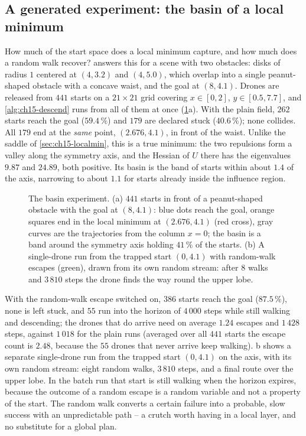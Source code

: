 \subsection{A generated experiment: the basin of a local minimum}
\label{sec:ch15-basin}

How much of the start space does a local minimum capture, and how much does
a random walk recover?  answers this for a scene
with two obstacles: disks of radius $1$ centered at $(4, 3.2)$ and $(4,
5.0)$, which overlap into a single peanut-shaped obstacle with a concave
waist, and the goal at $(8, 4.1)$. Drones are released from $441$ starts on
a $21 \times 21$ grid covering $x \in [0, 2]$, $y \in [0.5, 7.7]$, and
\cref{alg:ch15-descend} runs from all of them at once
(\cref{fig:ch15-basin}a). With the plain field, $262$ starts reach the goal
($59.4\,\%$) and $179$ are declared stuck ($40.6\,\%$); none collides. All
$179$ end at the \emph{same} point, $(2.676, 4.1)$, in front of the waist.
Unlike the saddle of \cref{sec:ch15-localmin}, this is a true minimum: the
two repulsions form a valley along the symmetry axis, and the Hessian of $U$
there has the eigenvalues $9.87$ and $24.89$, both positive. Its basin is
the band of starts within about $1.4$ of the axis, narrowing to about $1.1$
for starts already inside the influence region.

\begin{figure}[tb]
  \centering
  \caption{The basin experiment. (a) $441$ starts in front of a
  peanut-shaped obstacle with the goal at $(8, 4.1)$: blue dots reach the
  goal, orange squares end in the local minimum at $(2.676, 4.1)$ (red
  cross), gray curves are the trajectories from the column $x = 0$; the
  basin is a band around the symmetry axis holding $41\,\%$ of the starts.
  (b) A single-drone run from the trapped start $(0, 4.1)$ with random-walk
  escapes (green), drawn from its own random stream: after $8$ walks and
  $3\,810$ steps the drone finds the way round the upper lobe.}
  \label{fig:ch15-basin}
\end{figure}

With the random-walk escape switched on, $386$ starts reach the goal
($87.5\,\%$), none is left stuck, and $55$ run into the horizon of $4\,000$
steps while still walking and descending; the drones that do arrive need on
average $1.24$ escapes and $1\,428$ steps, against $1\,018$ for the plain runs
(averaged over all $441$ starts the escape count is $2.48$, because the $55$
drones that never arrive keep walking). b shows a
separate single-drone run from the trapped start $(0, 4.1)$ on the axis, with
its own random stream: eight random walks, $3\,810$ steps, and a final route
over the upper lobe. In the batch run that start is still walking when the
horizon expires, because the outcome of a random escape is a random variable
and not a property of the start.
The random walk converts a certain failure into a probable, slow success
with an unpredictable path -- a crutch worth having in a local layer, and no
substitute for a global plan.

